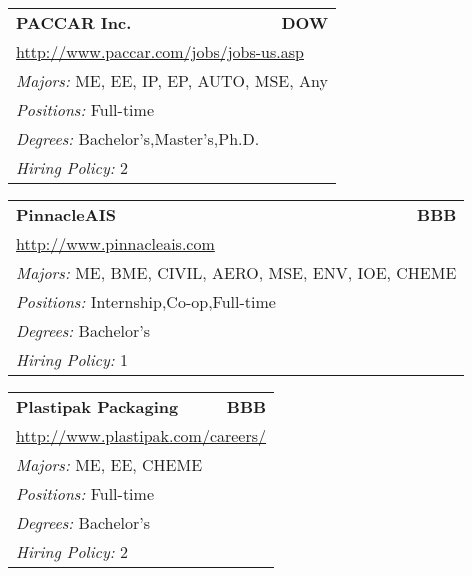 \documentclass[twoside]{article}
\begin{document}
\begin{center}
\begin{multicols}{3}
\begin{FlushLeft}
\begin{minipage}{.9\columnwidth}
\end{minipage}
 
\begin{minipage}{.9\columnwidth}\begin{tabularx}{.95\columnwidth}{Xr}
                 {\Large\bf PACCAR Inc.} & {\Large\bf DOW}\\
    \multicolumn{2}{p{.95\columnwidth}}{\url{http://www.paccar.com/jobs/jobs-us.asp}}\\
    \multicolumn{2}{p{.95\columnwidth}}{\emph{Majors:} ME, EE, IP, EP, AUTO, MSE, Any}\\
    \multicolumn{2}{p{.95\columnwidth}}{\emph{Positions:} Full-time}\\
    \multicolumn{2}{p{.95\columnwidth}}{\emph{Degrees:} Bachelor's,Master's,Ph.D.}\\
    \multicolumn{2}{p{.95\columnwidth}}{\emph{Hiring Policy:} 2}\\
    \end{tabularx}
    
\end{minipage}
 
\begin{minipage}{.9\columnwidth}\begin{tabularx}{.95\columnwidth}{Xr}
                 {\Large\bf PinnacleAIS} & {\Large\bf BBB}\\
    \multicolumn{2}{p{.95\columnwidth}}{\url{http://www.pinnacleais.com}}\\
    \multicolumn{2}{p{.95\columnwidth}}{\emph{Majors:} ME, BME, CIVIL, AERO, MSE, ENV, IOE, CHEME}\\
    \multicolumn{2}{p{.95\columnwidth}}{\emph{Positions:} Internship,Co-op,Full-time}\\
    \multicolumn{2}{p{.95\columnwidth}}{\emph{Degrees:} Bachelor's}\\
    \multicolumn{2}{p{.95\columnwidth}}{\emph{Hiring Policy:} 1}\\
    \end{tabularx}
    
\end{minipage}
 
\begin{minipage}{.9\columnwidth}\begin{tabularx}{.95\columnwidth}{Xr}
                 {\Large\bf Plastipak Packaging} & {\Large\bf BBB}\\
    \multicolumn{2}{p{.95\columnwidth}}{\url{http://www.plastipak.com/careers/}}\\
    \multicolumn{2}{p{.95\columnwidth}}{\emph{Majors:} ME, EE, CHEME}\\
    \multicolumn{2}{p{.95\columnwidth}}{\emph{Positions:} Full-time}\\
    \multicolumn{2}{p{.95\columnwidth}}{\emph{Degrees:} Bachelor's}\\
    \multicolumn{2}{p{.95\columnwidth}}{\emph{Hiring Policy:} 2}\\
    \end{tabularx}
    

\end{minipage}
\end{FlushLeft}
\end{multicols}
\end{center}
\end{document}

